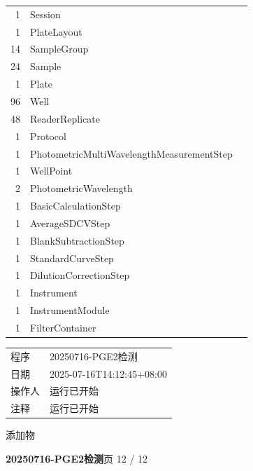 \documentclass[UTF8,10pt,a4paper,fontset=fandol]{ctexart}
\begin{document}
\begin{tabular}{rll}
1 & Session\\
1 & PlateLayout\\
14 & SampleGroup\\
24 & Sample\\
1 & Plate\\
96 & Well\\
48 & ReaderReplicate\\
1 & Protocol\\
1 & PhotometricMultiWavelengthMeasurementStep\\
1 & WellPoint\\
2 & PhotometricWavelength\\
1 & BasicCalculationStep\\
1 & AverageSDCVStep\\
1 & BlankSubtractionStep\\
1 & StandardCurveStep\\
1 & DilutionCorrectionStep\\
1 & Instrument\\
1 & InstrumentModule\\
1 & FilterContainer
\end{tabular}

\vspace{1em}

\begin{tabular}{@{}ll@{}}
程序 & 20250716-PGE2检测\\
日期 & 2025-07-16T14:12:45+08:00\\
操作人 & 运行已开始\\
注释 & 运行已开始\\
\end{tabular}

\vspace{0.5em}

\noindent
添加物


\newpage

\noindent\textbf{20250716-PGE2检测}\hfill 页 12 / 12
\end{document}
